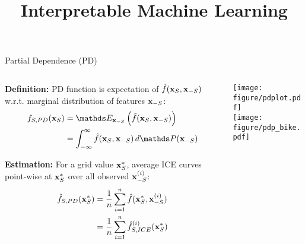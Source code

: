 \documentclass[11pt,compress,t,notes=noshow, aspectratio=169, xcolor=table]{beamer}
\title{Interpretable Machine Learning}
\date{}
\begin{document}
\newcommand{\titlefigure}{figure/pdp_bike}
\newcommand{\learninggoals}{
\item PD plots and relation to ICE plots
\item Interpretation of PDP
\item Extrapolation and Interactions in PDPs
\item Centered ICE and PDP
}


\begin{frame}{Partial Dependence (PD) }

\begin{columns}[T, totalwidth=\textwidth]
\begin{column}{0.55\textwidth}
\textbf{Definition:} PD function is expectation of $\hat{f}(\mathbf{x}_S, \mathbf{x}_{-S})$ w.r.t. marginal distribution of features $\mathbf{x}_{-S}$:
\begin{align*}
    f_{S, PD}(\xv_S) &= \E_{\xv_{-S}} \left( \fh(\xv_S, \xv_{-S}) \right) \\
    &= \int_{-\infty}^{\infty} \fh(\xv_S, \xv_{-S}) \, d\P(\xv_{-S})
\end{align*}

\medskip

\textbf{Estimation:} For a grid value $\mathbf{x}_S^*$, average ICE curves point-wise at $\mathbf{x}_S^*$ over all observed $\mathbf{x}_{-S}^{(i)}$:
\begin{align*}
    \hat{f}_{S, PD}(\mathbf{x}_S^*) &= \frac{1}{n} \sum_{i=1}^n \hat{f}(\mathbf{x}_S^*, \mathbf{x}_{-S}^{(i)})   \\
    &= \frac{1}{n} \sum_{i=1}^n \hat{f}_{S,ICE}^{(i)}(\mathbf{x}_S^*) 
\end{align*}

\end{column}

\begin{column}{0.43\textwidth}
\centering
\texttt{[image: figure/pdplot.pdf]}\\
\medskip
\texttt{[image: figure/pdp\_bike.pdf]}
\end{column}
\end{columns}

\end{frame}
\end{document}
